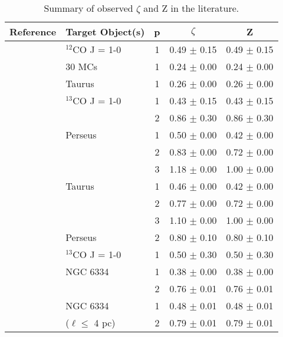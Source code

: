 \begin{table*} 
\centering 
	\begin{tabular}{l|l|ccc} 
	\centering 
		Reference & Target Object(s) & p & $\zeta$ & Z \\ \hline 
		\citet{Heyer2007} & $^{12}$CO J = 1-0 & 1 &  0.49 $\pm$  0.15 &  0.49 $\pm$  0.15 \\ 
		\citet{Heyer2015} & 30 MCs & 1 &  0.24 $\pm$  0.00 &  0.24 $\pm$  0.00 \\ 
					 & Taurus & 1 &  0.26 $\pm$  0.00 &  0.26 $\pm$  0.00 \\ 
		\citet{Miesch1994} & $^{13}$CO J = 1-0 & 1 &  0.43 $\pm$  0.15 &  0.43 $\pm$  0.15 \\ 
					   & 				 & 2 &  0.86 $\pm$  0.30 &  0.86 $\pm$  0.30 \\ 
		\citet{Padoan2003} & Perseus & 1 &  0.50 $\pm$  0.00 &  0.42 $\pm$  0.00 \\ 
					   &		 & 2 &  0.83 $\pm$  0.00 &  0.72 $\pm$  0.00 \\ 
					   &		 & 3 &  1.18 $\pm$  0.00 &  1.00 $\pm$  0.00 \\ 
					  & Taurus & 1 &  0.46 $\pm$  0.00 &  0.42 $\pm$  0.00 \\ 
					   &		 & 2 &  0.77 $\pm$  0.00 &  0.72 $\pm$  0.00 \\ 
					   &		 & 3 &  1.10 $\pm$  0.00 &  1.00 $\pm$  0.00 \\ 
		\citet{Padoan2006} & Perseus & 2 &  0.80 $\pm$  0.10 &  0.80 $\pm$  0.10 \\ 
		\citet{RomanDuval2011} & $^{13}$CO J = 1-0 & 1 &  0.50 $\pm$  0.30 &  0.50 $\pm$  0.30 \\ 
		\citet{Zernickel2015} & NGC 6334 & 1 &  0.38 $\pm$  0.00 &  0.38 $\pm$  0.00 \\ 
					   &		 & 2 &  0.76 $\pm$  0.01 &  0.76 $\pm$  0.01 \\ 
					 & NGC 6334  & 1 &  0.48 $\pm$  0.01 &  0.48 $\pm$  0.01 \\ 
					   & ($\ell \leq$ 4 pc) & 2 &  0.79 $\pm$  0.01 &  0.79 $\pm$  0.01 
	\end{tabular} 
	\caption{Summary of observed $\zeta$ and Z in the literature.} 
	\label{tab:discussion:summary_obs} 
\end{table*} 
